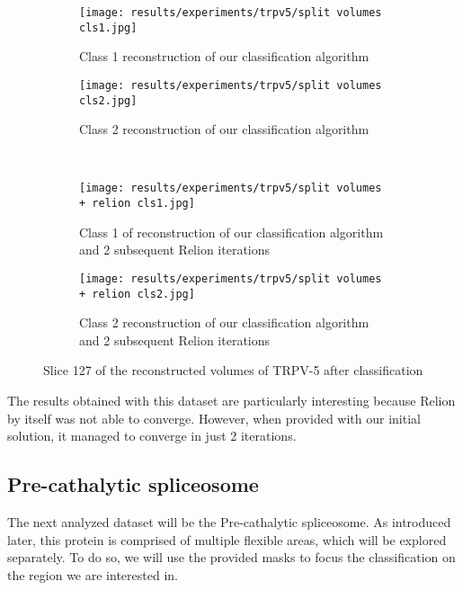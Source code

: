 \documentclass[../main.tex]{subfiles}
\begin{document}
\begin{figure}[hbp]
    \centering
    \begin{subfigure}[b]{0.33\textwidth}
         \centering
         \texttt{[image: results/experiments/trpv5/split volumes cls1.jpg]}
         \caption{Class 1 reconstruction of our classification algorithm}
    \end{subfigure}
    \hspace{2em}
    \begin{subfigure}[b]{0.33\textwidth}
         \centering
         \texttt{[image: results/experiments/trpv5/split volumes cls2.jpg]}
         \caption{Class 2 reconstruction of our classification algorithm}
    \end{subfigure}\\
    \vspace{2em}
    \begin{subfigure}[b]{0.33\textwidth}
         \centering
         \texttt{[image: results/experiments/trpv5/split volumes + relion cls1.jpg]}
         \caption{Class 1 of reconstruction of our classification algorithm and 2 subsequent Relion iterations}
    \end{subfigure}
    \hspace{2em}
    \begin{subfigure}[b]{0.33\textwidth}
         \centering
         \texttt{[image: results/experiments/trpv5/split volumes + relion cls2.jpg]}
         \caption{Class 2 reconstruction of our classification algorithm and 2 subsequent Relion iterations}
    \end{subfigure}
    \caption{Slice 127 of the reconstructed volumes of TRPV-5 after classification}
    \label{fig:5.2:trpv5_split_volumes}
\end{figure}

The results obtained with this dataset are particularly interesting because Relion by itself was not able to converge. However, when provided with our initial solution, it managed to converge in just 2 iterations.

\subsection{Pre-cathalytic spliceosome}
The next analyzed dataset will be the Pre-cathalytic spliceosome. As introduced later, this protein is comprised of multiple flexible areas, which will be explored separately. To do so, we will use the provided masks to focus the classification on the region we are interested in.
\end{document}
